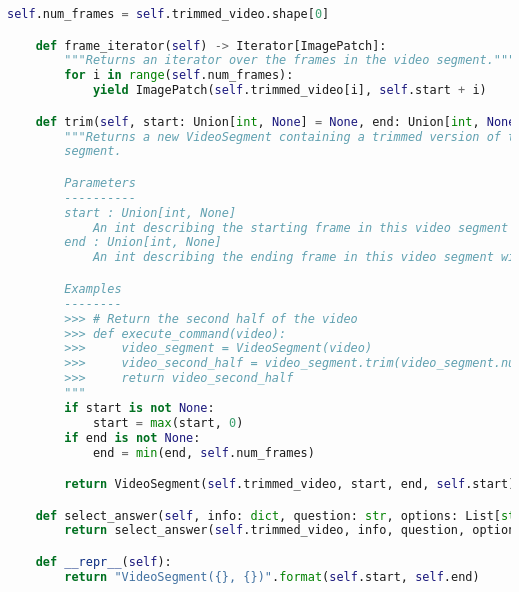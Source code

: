 \documentclass[10pt,twocolumn,letterpaper]{article}
\begin{document}
\begin{lstlisting}[language=Python, xleftmargin=.0\textwidth, xrightmargin=.0\textwidth, caption=\textbf{Full API.}, label={listing}]
        self.num_frames = self.trimmed_video.shape[0]

    def frame_iterator(self) -> Iterator[ImagePatch]:
        """Returns an iterator over the frames in the video segment."""
        for i in range(self.num_frames):
            yield ImagePatch(self.trimmed_video[i], self.start + i)

    def trim(self, start: Union[int, None] = None, end: Union[int, None] = None) -> VideoSegment:
        """Returns a new VideoSegment containing a trimmed version of the original video at the [start, end]
        segment.

        Parameters
        ----------
        start : Union[int, None]
            An int describing the starting frame in this video segment with respect to the original video.
        end : Union[int, None]
            An int describing the ending frame in this video segment with respect to the original video.

        Examples
        --------
        >>> # Return the second half of the video
        >>> def execute_command(video):
        >>>     video_segment = VideoSegment(video)
        >>>     video_second_half = video_segment.trim(video_segment.num_frames // 2, video_segment.num_frames)
        >>>     return video_second_half
        """
        if start is not None:
            start = max(start, 0)
        if end is not None:
            end = min(end, self.num_frames)

        return VideoSegment(self.trimmed_video, start, end, self.start)

    def select_answer(self, info: dict, question: str, options: List[str]) -> str:
        return select_answer(self.trimmed_video, info, question, options)

    def __repr__(self):
        return "VideoSegment({}, {})".format(self.start, self.end)
\end{lstlisting}
\end{document}
